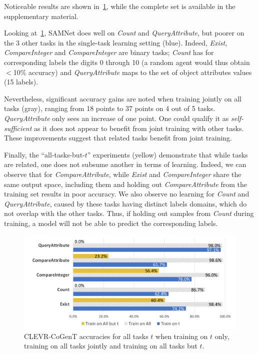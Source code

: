 Noticeable results are shown in~\cref{fig:CoGenT-results}, while the complete set is available in the supplementary material.%


Looking at~\cref{fig:CoGenT-results}, SAMNet does well on \textit{Count} and \textit{QueryAttribute}, but poorer on the 3 other tasks in the single-task learning setting (blue). Indeed, \textit{Exist}, \textit{CompareInteger} and \textit{CompareInteger} are binary tasks; \textit{Count} has for corresponding labels the digits 0 through 10 (a random agent would thus obtain $<$10\% accuracy) and \textit{QueryAttribute} maps to the set of object attributes values (15 labels).

Nevertheless, significant accuracy gains are noted when training jointly on all tasks (gray), ranging from 18 points to 37 points on 4 out of 5 tasks. \textit{QueryAttribute} only sees an increase of one point. One could qualify it as \textit{self-sufficient} as it does not appear to benefit from joint training with other tasks. These improvements suggest that related tasks benefit from joint training.

Finally, the ``all-tasks-but-$t$'' experiments (yellow) demonstrate that while tasks are related, one does not subsume another in terms of learning. Indeed, we can observe that for \textit{CompareAttribute}, while \textit{Exist} and \textit{CompareInteger} share the same output space, including them and holding out \textit{CompareAttribute} from the training set results in poor accuracy. We also observe no learning for \textit{Count} and \textit{QueryAttribute}, caused by these tasks having distinct labels domains, which do not overlap with the other tasks. Thus, if holding out samples from \textit{Count} during training, a model will not be able to predict the corresponding labels.

\begin{figure}[!t]
	\centering
	\includegraphics[width=\columnwidth]{img/results/CoGenT_results.pdf}
	\caption{CLEVR-CoGenT accuracies for all tasks $t$ when training on $t$ only, training on all tasks jointly and training on all tasks but $t$.} %
	\label{fig:CoGenT-results}
\end{figure}

